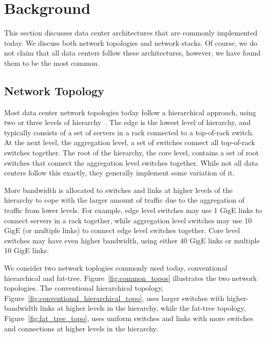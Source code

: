 \vspace{-0.1in}
\section{Background}
\label{sec:background}

This section discusses data center architectures that are commonly implemented today. We discuss both network topologies and network stacks.  Of course, we do not claim that all data centers follow these architectures, however, we have found them to be the most common.


\subsection {Network Topology}

Most data center network topologies today follow a hierarchical approach, using two or three levels of hierarchy~\cite{Al-Fares:2008:SCD}.  The edge is the lowest level of hierarchy, and typically consists of a set of servers in a rack connected to a top-of-rack switch.  At the next level, the aggregation level, a set of switches connect all top-of-rack switches together.  The root of the hierarchy, the core level, contains a set of root switches that connect the aggregation level switches together.  While not all data centers follow this exactly, they generally implement some variation of it.

More bandwidth is allocated to switches and links at higher levels of the hierarchy to cope with the larger amount of traffic due to the aggregation of traffic from lower levels.  For example, edge level switches may use 1 GigE links to connect servers in a rack together, while aggregation level switches may use 10 GigE (or multiple links) to connect edge level switches together.  Core level switches may have even higher bandwidth, using either 40 GigE links or multiple 10 GigE links.

We consider two network toplogies commonly used today, conventional hierarchical and fat-tree.  Figure~\ref{fig:common_topos} illustrates the two network topologies.  The conventional hierarchical topology, Figure~\ref{fig:conventional_hierarchical_topo}, uses larger switches with higher-bandwidth links at higher levels in the hierarchy, while the fat-tree topology, Figure~\ref{fig:fat_tree_topo}, uses uniform switches and links with more switches and connections at higher levels in the hierarchy.


